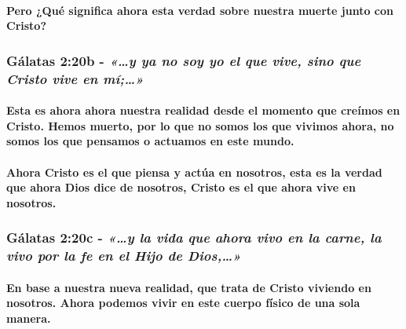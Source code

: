 \documentclass[11a pt,twoside]{article}
\newcommand{\scripture}[1]{%
  {\fontsize{12pt}{16pt}\selectfont\ScriptureFont\itshape #1}%
}
\let\oldsubsubsection\subsubsection
\renewcommand{\subsubsection}{\needspace{4\baselineskip}\oldsubsubsection}
\let\oldparagraph\paragraph
\renewcommand{\paragraph}{\needspace{3\baselineskip}\oldparagraph}
\begin{document}
\paragraph{Pero ¿Qué significa ahora esta verdad sobre nuestra muerte
junto con
Cristo?}\label{pero-quuxe9-significa-ahora-esta-verdad-sobre-nuestra-muerte-junto-con-cristo}

\subsubsection{\texorpdfstring{Gálatas 2:20b -
\scripture{«…y ya no soy yo el que vive, sino que Cristo vive en mí;…»}}{Gálatas 2:20b - }}\label{guxe1latas-220b---y-ya-no-soy-yo-el-que-vive-sino-que-cristo-vive-en-muxed}

\paragraph{Esta es ahora ahora nuestra realidad desde el momento que
creímos en Cristo. Hemos muerto, por lo que no somos los que vivimos
ahora, no somos los que pensamos o actuamos en este
mundo.}\label{esta-es-ahora-ahora-nuestra-realidad-desde-el-momento-que-creuxedmos-en-cristo.-hemos-muerto-por-lo-que-no-somos-los-que-vivimos-ahora-no-somos-los-que-pensamos-o-actuamos-en-este-mundo.}

\paragraph{Ahora Cristo es el que piensa y actúa en nosotros, esta es la
verdad que ahora Dios dice de nosotros, Cristo es el que ahora vive en
nosotros.}\label{ahora-cristo-es-el-que-piensa-y-actuxfaa-en-nosotros-esta-es-la-verdad-que-ahora-dios-dice-de-nosotros-cristo-es-el-que-ahora-vive-en-nosotros.}

\subsubsection{\texorpdfstring{Gálatas 2:20c -
\scripture{«…y la vida que ahora vivo en la carne, la vivo por la fe en el Hijo de Dios,…»}}{Gálatas 2:20c - }}\label{guxe1latas-220c---y-la-vida-que-ahora-vivo-en-la-carne-la-vivo-por-la-fe-en-el-hijo-de-dios}

\paragraph{En base a nuestra nueva realidad, que trata de Cristo
viviendo en nosotros. Ahora podemos vivir en este cuerpo físico de una
sola
manera.}\label{en-base-a-nuestra-nueva-realidad-que-trata-de-cristo-viviendo-en-nosotros.-ahora-podemos-vivir-en-este-cuerpo-fuxedsico-de-una-sola-manera.}
\end{document}
